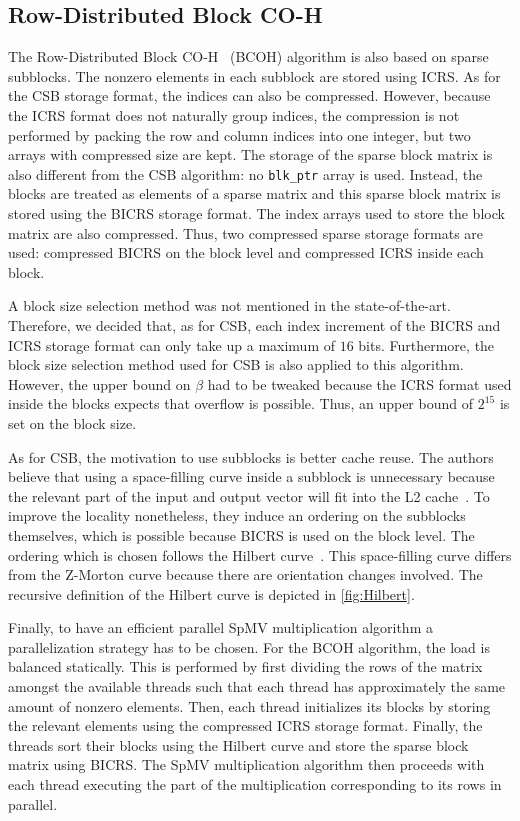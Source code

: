 \documentclass{siamart220329}
\begin{document}
\subsection{Row-Distributed Block CO-H}
The Row-Distributed Block CO-H~\cite{high-level-SpMV} (BCOH) algorithm is also based on sparse subblocks. The nonzero elements in each subblock are stored using ICRS. As for the CSB storage format, the indices can also be compressed. However, because the ICRS format does not naturally group indices, the compression is not performed by packing the row and column indices into one integer, but two arrays with compressed size are kept. The storage of the sparse block matrix is also different from the CSB algorithm: no \texttt{blk\_ptr} array is used. Instead, the blocks are treated as elements of a sparse matrix and this sparse block matrix is stored using the BICRS storage format. The index arrays used to store the block matrix are also compressed. Thus, two compressed sparse storage formats are used: compressed BICRS on the block level and compressed ICRS inside each block.

A block size selection method was not mentioned in the state-of-the-art. Therefore, we decided that, as for CSB, each index increment of the BICRS and ICRS storage format can only take up a maximum of $16$ bits. Furthermore, the block size selection method used for CSB is also applied to this algorithm. However, the upper bound on $\beta$ had to be tweaked because the ICRS format used inside the blocks expects that overflow is possible. Thus, an upper bound of $2^{15}$ is set on the block size.

As for CSB, the motivation to use subblocks is better cache reuse. The authors believe that using a space-filling curve inside a subblock is unnecessary because the relevant part of the input and output vector will fit into the L2 cache~\cite{high-level-SpMV}. To improve the locality nonetheless, they induce an ordering on the subblocks themselves, which is possible because BICRS is used on the block level. The ordering which is chosen follows the Hilbert curve~\cite{Hilbert-Curve}. This space-filling curve differs from the Z-Morton curve because there are orientation changes involved. The recursive definition of the Hilbert curve is depicted in \cref{fig:Hilbert}.



Finally, to have an efficient parallel SpMV multiplication algorithm a parallelization strategy has to be chosen. For the BCOH algorithm, the load is balanced statically. This is performed by first dividing the rows of the matrix amongst the available threads such that each thread has approximately the same amount of nonzero elements. Then, each thread initializes its blocks by storing the relevant elements using the compressed ICRS storage format. Finally, the threads sort their blocks using the Hilbert curve and store the sparse block matrix using BICRS. The SpMV multiplication algorithm then proceeds with each thread executing the part of the multiplication corresponding to its rows in parallel.
\end{document}
